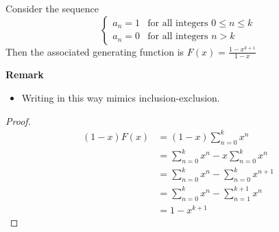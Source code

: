 \begin{theorem}
    Consider the sequence 
    \begin{equation}
        \begin{cases}
            a_n=1& \text{for all integers $0 \leq n \leq k$}\\
            a_n=0& \text{for all integers $n>k$}
        \end{cases}
    \end{equation}
    Then the associated generating function is $F(x)=\frac{1-x^{k+1}}{1-x}$
\end{theorem}
\textbf{Remark}
\begin{itemize}
    \item Writing in this way mimics inclusion-exclusion.
\end{itemize}
\begin{proof}
    \begin{equation}
        \begin{split}
            (1-x)F(x) &= (1-x)\sum_{n=0}^{k}x^n\\
            &= \sum_{n=0}^{k}x^n - x \sum_{n=0}^{k}x^n\\
            &= \sum_{n=0}^{k}x^n - \sum_{n=0}^{k}x^{n+1}\\
            &= \sum_{n=0}^{k}x^n - \sum_{n=1}^{k+1}x^n\\
            &= 1-x^{k+1}
        \end{split}
    \end{equation}
\end{proof}

